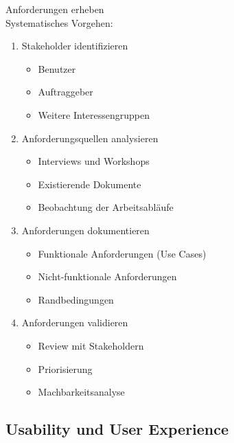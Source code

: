 \begin{KR}{Anforderungen erheben}\\
Systematisches Vorgehen:
\begin{enumerate}
    \item Stakeholder identifizieren
    \begin{itemize}
        \item Benutzer
        \item Auftraggeber
        \item Weitere Interessengruppen
    \end{itemize}
    
    \item Anforderungsquellen analysieren
    \begin{itemize}
        \item Interviews und Workshops
        \item Existierende Dokumente
        \item Beobachtung der Arbeitsabläufe
    \end{itemize}
    
    \item Anforderungen dokumentieren
    \begin{itemize}
        \item Funktionale Anforderungen (Use Cases)
        \item Nicht-funktionale Anforderungen
        \item Randbedingungen
    \end{itemize}
    
    \item Anforderungen validieren
    \begin{itemize}
        \item Review mit Stakeholdern
        \item Priorisierung
        \item Machbarkeitsanalyse
    \end{itemize}
\end{enumerate}
\end{KR}

\subsection{Usability und User Experience}

